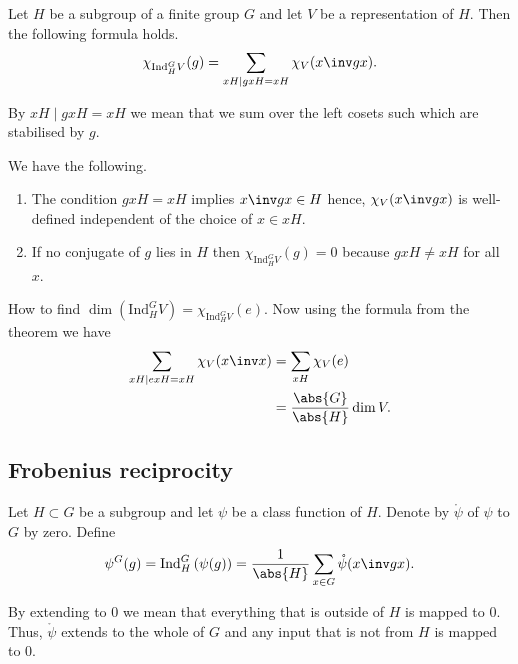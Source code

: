 \documentclass[12pt, a4paper]{article}
\begin{document}
\begin{mdthm}
    Let \(H\) be a subgroup of a finite group \(G\) and let \(V\) be a representation of \(H\). Then the following formula holds.
    \[\chi_{\text{Ind}_H^G V}(g) = \sum_{xH \mid gxH = xH} \chi_V(x\inv gx).\]
\end{mdthm}

\begin{mdnote}
    By \(xH \mid gxH =xH\) we mean that we sum over the left cosets such which are stabilised by \(g\).
\end{mdnote}

\begin{mdremark}
    We have the following.
    \begin{enumerate}
        \item The condition \(gxH =xH\) implies \(x\inv g x \in H\) hence, \(\chi_V(x\inv gx)\) is well-defined independent of the choice of \(x\in xH\).
        \item If no conjugate of \(g\) lies in \(H\) then \(\chi_{\text{Ind}_H^G V}(g)=0\) because \(gxH \neq xH\) for all \(x\).
    \end{enumerate}
\end{mdremark}

\begin{mdexample}
    How to find \(\dim(\text{Ind}_H^G V) = \chi_{\text{Ind}_H^G V}(e)\). Now using the formula from the theorem we have 
    \[\begin{aligned}
        \sum_{xH \mid exH =xH} \chi_V(x\inv x) &= \sum_{xH } \chi_V(e) \\
        &= \frac{\abs{G}}{\abs{H}}\dim V.
    \end{aligned}\]
\end{mdexample}

\subsection{Frobenius reciprocity}

\begin{definition}
    Let \(H \subset G\) be a subgroup and let \(\psi\) be a class function of \(H\). Denote by \(\mathring{\psi}\) of \(\psi\) to \(G\) by zero. Define 
    \[\psi^G(g) = \text{Ind}_H^G\left( \psi(g) \right) = \frac{1}{\abs{H}} \sum_{x\in G} \mathring{\psi}(x\inv gx).\]
\end{definition}

\begin{mdnote}
    By extending to \(0\) we mean that everything that is outside of \(H\) is mapped to \(0\). Thus, \(\mathring{\psi}\) extends to the whole of \(G\) and any input that is not from \(H\) is mapped to \(0\).
\end{mdnote}
\end{document}
